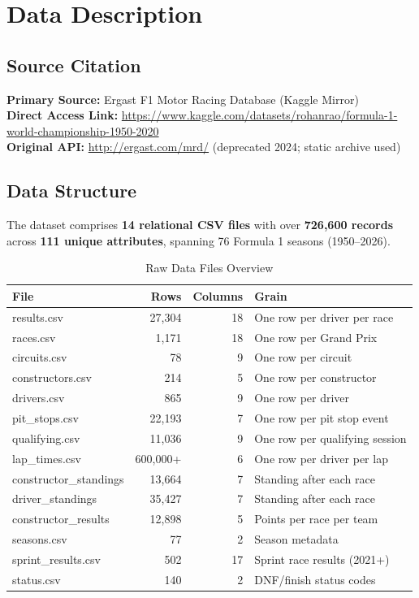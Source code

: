 \documentclass[12pt, a4paper]{article}
\begin{document}
\section{Data Description}

\subsection{Source Citation}
\textbf{Primary Source:} Ergast F1 Motor Racing Database (Kaggle Mirror)\\
\textbf{Direct Access Link:} \url{https://www.kaggle.com/datasets/rohanrao/formula-1-world-championship-1950-2020}\\
\textbf{Original API:} \url{http://ergast.com/mrd/} (deprecated 2024; static archive used)

\subsection{Data Structure}
The dataset comprises \textbf{14 relational CSV files} with over \textbf{726,600 records} across \textbf{111 unique attributes}, spanning 76 Formula 1 seasons (1950--2026).

\begin{table}[H]
\centering
\caption{Raw Data Files Overview}
\label{tab:raw_data}
\begin{tabular}{l r r l}
\toprule
\textbf{File} & \textbf{Rows} & \textbf{Columns} & \textbf{Grain} \\
\midrule
results.csv             & 27,304  & 18 & One row per driver per race \\
races.csv               & 1,171   & 18 & One row per Grand Prix \\
circuits.csv            & 78      & 9  & One row per circuit \\
constructors.csv        & 214     & 5  & One row per constructor \\
drivers.csv             & 865     & 9  & One row per driver \\
pit\_stops.csv          & 22,193  & 7  & One row per pit stop event \\
qualifying.csv          & 11,036  & 9  & One row per qualifying session \\
lap\_times.csv          & 600,000+& 6  & One row per driver per lap \\
constructor\_standings   & 13,664  & 7  & Standing after each race \\
driver\_standings        & 35,427  & 7  & Standing after each race \\
constructor\_results     & 12,898  & 5  & Points per race per team \\
seasons.csv             & 77      & 2  & Season metadata \\
sprint\_results.csv     & 502     & 17 & Sprint race results (2021+) \\
status.csv              & 140     & 2  & DNF/finish status codes \\
\bottomrule
\end{tabular}
\end{table}
\end{document}

